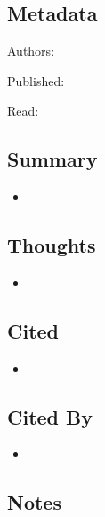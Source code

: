 \documentclass{article}
\begin{document}
\pagebreak


\section*{}

\subsection*{Metadata}

\noindent Authors: 

\noindent Published:

\noindent Read:

\subsection*{Summary}
\begin{itemize}
	\item
\end{itemize}

\subsection*{Thoughts}
\begin{itemize}
	\item
\end{itemize}

\subsection*{Cited}
\begin{itemize}
	\item
\end{itemize}

\subsection*{Cited By}
\begin{itemize}
	\item
\end{itemize}

\subsection*{Notes}
\end{document}
